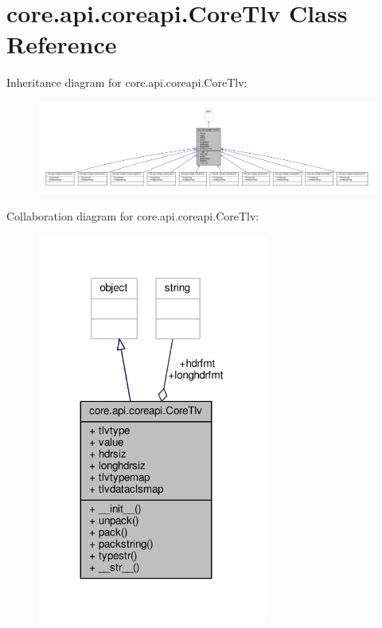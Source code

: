 \hypertarget{classcore_1_1api_1_1coreapi_1_1_core_tlv}{\section{core.\+api.\+coreapi.\+Core\+Tlv Class Reference}
\label{classcore_1_1api_1_1coreapi_1_1_core_tlv}
}


Inheritance diagram for core.\+api.\+coreapi.\+Core\+Tlv\+:
\nopagebreak
\begin{figure}[H]
\begin{center}
\leavevmode
\includegraphics[width=350pt]{classcore_1_1api_1_1coreapi_1_1_core_tlv__inherit__graph}
\end{center}
\end{figure}


Collaboration diagram for core.\+api.\+coreapi.\+Core\+Tlv\+:
\nopagebreak
\begin{figure}[H]
\begin{center}
\leavevmode
\includegraphics[width=215pt]{classcore_1_1api_1_1coreapi_1_1_core_tlv__coll__graph}
\end{center}
\end{figure}
